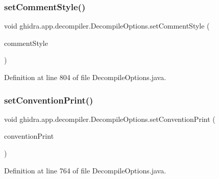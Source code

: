 \subsubsection{\texorpdfstring{setCommentStyle()}{setCommentStyle()}}
{\footnotesize\ttfamily void ghidra.\+app.\+decompiler.\+Decompile\+Options.\+set\+Comment\+Style (\begin{DoxyParamCaption}\item[{\mbox{\hyperlink{enumghidra_1_1app_1_1decompiler_1_1_decompile_options_1_1_comment_style_enum}{Comment\+Style\+Enum}}}]{comment\+Style }\end{DoxyParamCaption})\hspace{0.3cm}{\ttfamily [inline]}}



Definition at line 804 of file Decompile\+Options.\+java.

\mbox{\label{classghidra_1_1app_1_1decompiler_1_1_decompile_options_a94f5cfdfb54b4b87010655bbe5cd9709}} 
\subsubsection{\texorpdfstring{setConventionPrint()}{setConventionPrint()}}
{\footnotesize\ttfamily void ghidra.\+app.\+decompiler.\+Decompile\+Options.\+set\+Convention\+Print (\begin{DoxyParamCaption}\item[{boolean}]{convention\+Print }\end{DoxyParamCaption})\hspace{0.3cm}{\ttfamily [inline]}}



Definition at line 764 of file Decompile\+Options.\+java.

\mbox{\label{classghidra_1_1app_1_1decompiler_1_1_decompile_options_a35af502b44f9aae023f5a684d77dd33c}} 
